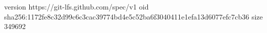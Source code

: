 version https://git-lfs.github.com/spec/v1
oid sha256:1172fe8c32d99c6c3cac39774bd4e5c52ba6f3040411e1efa13d6077efc7cb36
size 349692
